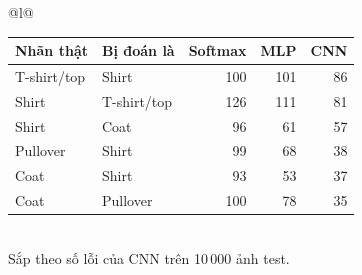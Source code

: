 \begin{tabular}{@{}l@{}}
\begin{tabular}{llrrr}
\toprule
Nhãn thật & Bị đoán là & Softmax & MLP & CNN \\
\midrule
T-shirt/top & Shirt & 100 & 101 & 86 \\
Shirt & T-shirt/top & 126 & 111 & 81 \\
Shirt & Coat & 96 & 61 & 57 \\
Pullover & Shirt & 99 & 68 & 38 \\
Coat & Shirt & 93 & 53 & 37 \\
Coat & Pullover & 100 & 78 & 35 \\
\bottomrule
\end{tabular}
\\[2pt]
{\footnotesize Sắp theo số lỗi của CNN trên 10\,000 ảnh test.}
\end{tabular}
